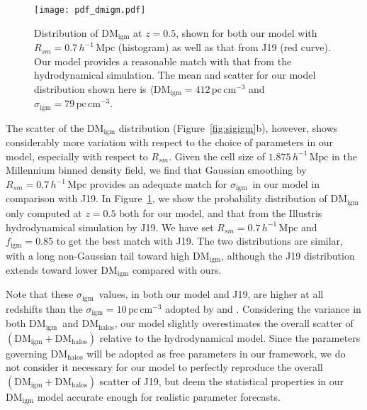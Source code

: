 \documentclass[twocolumn]{aastex63}
\newcommand{\dmhalo}{\ensuremath{\mathrm{DM}_\mathrm{halos}}}
\newcommand{\dmigm}{\ensuremath{\mathrm{DM}_\mathrm{igm}}}
\newcommand{\pccmcube}{\ensuremath{\mathrm{pc}\,\mathrm{cm}^{-3}}}
\newcommand{\sigigm}{\ensuremath{\sigma_\mathrm{igm}}}
\newcommand{\figm}{\ensuremath{f_\mathrm{igm}}}
\newcommand{\hmpc}{\ensuremath{h^{-1}\,\mathrm{Mpc}}}
\begin{document}
\begin{CJK*}{UTF8}{gbsn}
\begin{figure}
\texttt{[image: pdf\_dmigm.pdf]}
\caption{\label{fig:pdf_dmigm}
Distribution of \dmigm{} at $z=0.5$, shown for both our model with $R_{sm}= 0.7\,\hmpc$ (histogram) as well as that from J19 (red curve). Our model provides a reasonable
match with that from the hydrodynamical simulation. The mean and scatter for our model distribution shown here is $\langle \dmigm = 412\,\pccmcube$ and $\sigigm = 79\,\pccmcube$. 
}
\end{figure}

The scatter of the \dmigm{} distribution (Figure~\ref{fig:sigigm}b), however, shows considerably more variation with respect to the choice of parameters
in our model, especially with respect to 
$R_{sm}$. Given the cell size of $1.875\,\hmpc$ in the Millennium binned density field, we find that Gaussian smoothing by $R_{sm}=0.7\,\hmpc$ provides an adequate match for \sigigm\ in our model 
in comparison with J19.
In Figure~\ref{fig:pdf_dmigm}, we show the probability distribution of \dmigm{} only computed at $z=0.5$ both for our model, and 
that from the Illustris hydrodynamical simulation by J19. We have set $R_{sm} = 0.7\,\hmpc$ and $\figm= 0.85$ to get the best match with J19. 
The two distributions are similar, with a long non-Gaussian tail toward high \dmigm{}, although the J19 distribution extends toward lower \dmigm{}
compared with ours.

Note that these \sigigm\ values, in both our model and J19, are higher at all redshifts than the $\sigigm = 10\,\pccmcube$ adopted by \citet{walters:2019} and \citet{ravi:2019}.
Considering the variance in both \dmigm\ and \dmhalo, our model slightly overestimates the
overall scatter of $(\dmigm + \dmhalo)$ relative to the hydrodynamical model. Since the parameters governing
\dmhalo{} will be adopted as free parameters in our framework, we do not consider it necessary for our model to perfectly reproduce 
the overall $(\dmigm + \dmhalo)$ scatter of J19, 
but deem the statistical properties in our \dmigm{} model accurate enough for realistic parameter forecasts.



\end{CJK*}
\end{document}
